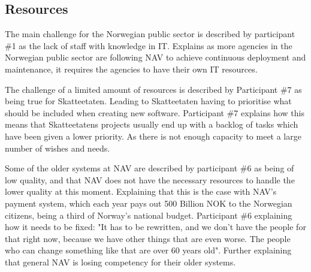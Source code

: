 \subsection{Resources} \label{sec:resources}
The main challenge for the Norwegian public sector is described by participant \#1 as the lack of staff with knowledge in IT. Explains as more agencies in the Norwegian public sector are following NAV to achieve continuous deployment and maintenance, it requires the agencies to have their own IT resources.


The challenge of a limited amount of resources is described by Participant \#7 as being true for Skatteetaten. Leading to Skatteetaten having to prioritise what should be included when creating new software. Participant \#7 explains how this means that  Skatteetatens projects usually end up with a backlog of tasks which have been given a lower priority. As there is not enough capacity to meet a large number of wishes and needs.


Some of the older systems at NAV are described by participant \#6 as being of low quality, and that NAV does not have the necessary resources to handle the lower quality at this moment. Explaining that this is the case with NAV's payment system, which each year pays out 500 Billion NOK to the Norwegian citizens, being a third of Norway's national budget. Participant \#6 explaining how it needs to be fixed: "It has to be rewritten, and we don't have the people for that right now, because we have other things that are even worse. The people who can change something like that are over 60 years old". Further explaining that general NAV is losing competency for their older systems.


